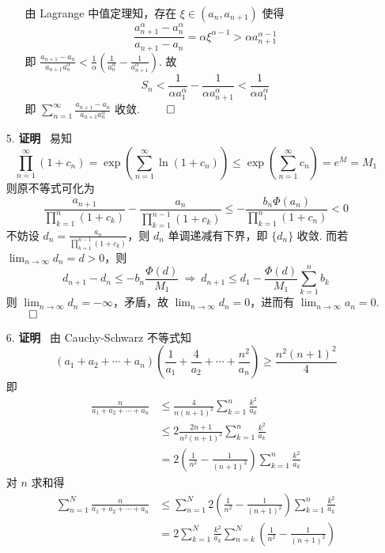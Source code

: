 \documentclass[11pt,oneside,fontset=fandol]{ctexbook} %
\begin{document}
\begin{enumerate}
\begin{enumerate}
        由 Lagrange 中值定理知，存在 $\xi \in (a_n, a_{n+1})$ 使得
        \[
            \frac{a_{n+1}^{\alpha} - a_n^{\alpha}}{a_{n+1} - a_n} = \alpha \xi^{\alpha - 1} > \alpha a_{n+1}^{\alpha - 1}
        \]
        即 $\frac{a_{n+1} - a_n}{a_{n+1} a_n^{\alpha}} < \frac 1 {\alpha} \left( \frac 1 {a_n^{\alpha}} - \frac 1 {a_{n+1}^{\alpha}} \right)$. 故
        \[
            S_n < \frac 1 {\alpha a_1^{\alpha}}  - \frac 1 {\alpha a_{n+1}^{\alpha}} < \frac 1 {\alpha a_1^{\alpha}}
        \]
        即 $\sum_{n=1}^{\infty} \frac{a_{n+1} - a_n}{a_{n+1} a_n^{\alpha}}$ 收敛.
        $\hfill\qed$
    \end{enumerate}
    \item[5.]
    \textbf{证明} \ 易知
    \[
        \prod_{n=1}^{\infty} (1 + c_n) = \exp\left( \sum_{n=1}^{\infty} \ln(1 + c_n) \right) \leqslant \exp\left( \sum_{n=1}^{\infty} c_n \right) = e^M = M_1
    \]
    则原不等式可化为
    \[
        \frac{a_{n+1}}{\prod_{k=1}^n (1+c_k)} - \frac{a_n}{\prod_{k=1}^{n-1} (1+c_k)} \leqslant - \frac{b_n \Phi(a_n)}{\prod_{k=1}^n (1+c_n)} < 0
    \]
    不妨设 $d_n = \frac{a_n}{\prod_{k=1}^{n-1} (1+c_k)}$，则 $d_n$ 单调递减有下界，即 $\{ d_n \}$ 收敛. 而若 $\lim_{n \to \infty} d_n = d > 0$，则
    \[
        d_{n+1} - d_n \leqslant -b_n \frac{\Phi(d)}{M_1} \ \Rightarrow \ d_{n+1} \leqslant d_1 - \frac{\Phi(d)}{M_1} \sum_{k=1}^{n} b_k
    \]
    则 $\lim_{n \to \infty} d_n = -\infty$，矛盾，故 $\lim_{n \to \infty} d_n = 0$，进而有 $\lim_{n \to \infty} a_n = 0$.
    $\hfill\qed$
    \item[6.]
    \textbf{证明} \ 由 Cauchy-Schwarz 不等式知
    \[
        (a_1 + a_2 + \cdots + a_n)\left( \frac 1 {a_1} + \frac 4 {a_2} + \cdots + \frac{n^2}{a_n} \right) \geqslant \frac {n^2(n+1)^2} 4
    \]
    即
    \begin{align*}
        \frac n {a_1 + a_2 + \cdots + a_n} &\leqslant \frac 4 {n(n+1)^2} \sum_{k=1}^n \frac{k^2}{a_k} \\
        &\leqslant 2 \frac{2n+1}{n^2(n+1)^2} \sum_{k=1}^n \frac{k^2}{a_k} \\
        &= 2 \left( \frac 1 {n^2} - \frac 1 {(n+1)^2} \right) \sum_{k=1}^n \frac{k^2}{a_k}
    \end{align*}
    对 $n$ 求和得
    \begin{align*}
        \sum_{n=1}^N \frac n {a_1 + a_2 + \cdots + a_n} &\leqslant \sum_{n=1}^N 2 \left( \frac 1 {n^2} - \frac 1 {(n+1)^2} \right) \sum_{k=1}^n \frac{k^2}{a_k} \\
        &= 2 \sum_{k=1}^N \frac{k^2}{a_k} \sum_{n=k}^N \left( \frac 1 {n^2} - \frac 1 {(n+1)^2} \right) \\

\end{align*}
\end{enumerate}
\end{document}
